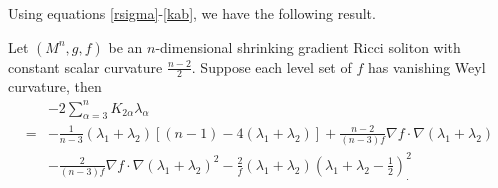 \documentclass[12pt]{amsart}
\begin{document}
	
	Using equations \eqref{rsigma}-\eqref{kab}, we have the following result.
	
	\begin{lem}\label{lek2a}
		Let $(M^n, g, f)$ be an $n$-dimensional shrinking gradient Ricci soliton with constant scalar curvature $\frac{n-2}{2}$. Suppose each level set of $f$ has vanishing Weyl curvature, then
 \begin{equation*}
	\begin{aligned}
		&-2\sum_{\alpha=3}^n K_{2\alpha}\lambda_\alpha\\
		=&-\frac{1}{n-3}(\lambda_1+\lambda_2)[(n-1)-4(\lambda_1+\lambda_2)] +\frac{n-2}{(n-3)f}\nabla f\cdot \nabla (\lambda_1+\lambda_2)\\
		&-\frac{2}{(n-3)f}\nabla f\cdot \nabla(\lambda_1+\lambda_2)^2
		-\frac{2}{f}(\lambda_1+\lambda_2)({\lambda_1+\lambda_2-\frac{1}{2}})^2  _.
	\end{aligned}
\end{equation*}
\end{lem}
\end{document}
